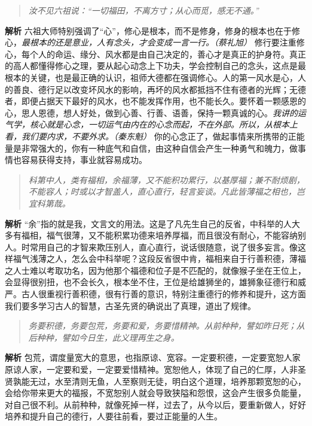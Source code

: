 \begin{quote}\it
    汝不见六祖说：“一切福田，不离方寸；从心而觅，感无不通。”
\end{quote}

\textbf{解析} 六祖大师特别强调了“心”，修心是根本，而不是修身，修身的根本也在于修心，\textit{最根本的还是意业，人有念头，才会变成一言一行。（蔡礼旭）} 修行要注重修心，每个人的命运、缘分、风水都是由自己决定的，善心才是真正的护身符。真正的高人都懂得修心之理，要从起心动念上下功夫，学会控制自己的念头，这点是最根本的关键，也是最正确的认识，祖师大德都在强调修心。人的第一风水是心，人的善良、德行足以改变坏风水的影响，再坏的风水都抵挡不住有德者的光辉；无德者，即便占据天下最好的风水，也不能发挥作用，也不能长久。要怀着一颗感恩的心，思人恩德，想人好处，做到心善、行善、语善，保持一颗真诚的心。\textit{我讲的运气学，核心就是心念，一切运气由内在的心念而起，不在外部。所以，从根本上看，我们要内求，不要外求。（秦东魁）} 你的心念正了，做起事情来所携带的正能量是非常强大的，你有一种底气和自信，由这种自信会产生一种勇气和魄力，做事情也容易获得支持，事业就容易成功。

\begin{quote}\it
    科第中人，类有福相，余福薄，又不能积功累行，以基厚福；兼不耐烦剧，不能容人；时或以才智盖人，直心直行，轻言妄谈。凡此皆薄福之相也，岂宜科第哉。
\end{quote}

\textbf{解析} “余”指的就是我，文言文的用法。这是了凡先生自己的反省，中科举的人大多有福相，福气很薄，又不能积累功德来培养厚福，而且很没有耐心，不能容纳别人。时常用自己的才智来欺压别人，直心直行，说话很随意，说了很多妄言。像这样福气浅薄之人，怎么会中科举呢？这段反省很中肯，福相来自于行善积德，薄福之人士难以考取功名，因为他那个福德和位子是不匹配的，就像猴子坐在王位上，会显得很别扭，也不会长久，根本坐不住，王位是给雄狮坐的，雄狮象征德行和威严。古人很重视行善积德，很有行善的意识，特别注重德行的修养和提升，这方面我们要多学习古人的智慧，古圣先贤的确说出了真理，道出了规律。

\begin{quote}\it
    务要积德，务要包荒，务要和爱，务要惜精神。从前种种，譬如昨日死；从后种种，譬如今日生，此义理再生之身。
\end{quote}

\textbf{解析} 包荒，谓度量宽大的意思，也指原谅、宽容。一定要积德，一定要宽恕人家原谅人家，一定要和爱，一定要爱惜精神。宽恕他人，体现了自己的仁厚，人非圣贤孰能无过，水至清则无鱼，人至察则无徒，明白这个道理，培养那颗宽恕的心，会给你带来更大的福报，不宽恕别人就会导致狭隘和怨恨，这会产生很多负能量，对自己很不利。从前种种，就像死掉一样，过去了，从今以后，要重新做人，好好培养和提升自己的德行，人要往前看，要过正能量的人生。

